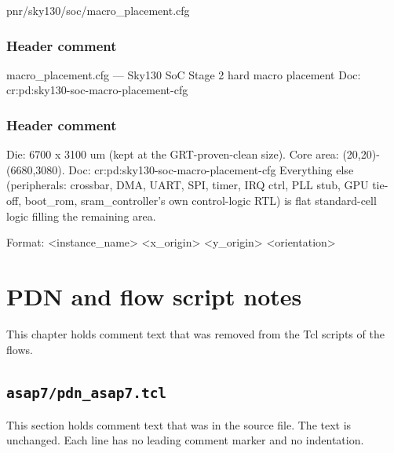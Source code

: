 \begin{relocated}{pnr/sky130/soc/macro_placement.cfg}

\subsection*{Header comment}

\begin{textblock}
macro_placement.cfg — Sky130 SoC Stage 2 hard macro placement
Doc: cr:pd:sky130-soc-macro-placement-cfg
\end{textblock}

\subsection*{Header comment}

\begin{textblock}
Die: 6700 x 3100 um (kept at the GRT-proven-clean size). Core area:
(20,20)-(6680,3080).
Doc: cr:pd:sky130-soc-macro-placement-cfg
Everything else (peripherals: crossbar, DMA, UART, SPI, timer, IRQ ctrl,
PLL stub, GPU tie-off, boot_rom, sram_controller's own control-logic
RTL) is flat standard-cell logic filling the remaining area.

Format: <instance_name> <x_origin> <y_origin> <orientation>
\end{textblock}

\end{relocated}

\chapter{PDN and flow script notes}\label{tm:ch:pd-flow-script-notes}

This chapter holds comment text that was removed from the Tcl scripts of the flows.

\section{\texttt{asap7/pdn\_asap7.tcl}}\label{tm:pd:asap7-pdn-tcl}

This section holds comment text that was in the source file. The text is unchanged. Each line has no leading comment marker and no indentation.


